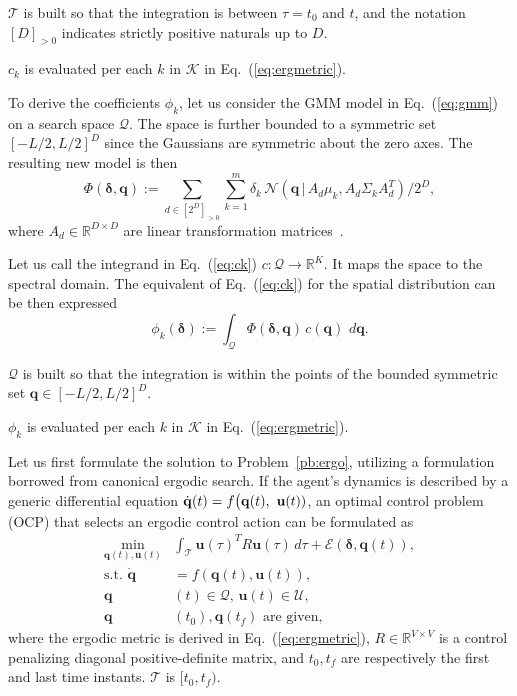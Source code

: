 \documentclass[letterpaper,10pt,conference,twoside]{IEEEtran}
\theoremstyle{definition}
\begin{document}
$\mathcal{T}$ is built so that the integration is between $\tau=t_0$ and $t$, and the notation $[D]_{>0}$ indicates strictly positive naturals up to $D$.

$c_k$ is evaluated per each $k$ in $\mathcal{K}$ in Eq.~(\ref{eq:ergmetric}).

To derive the coefficients $\phi_k$, let us consider the GMM model in Eq.~(\ref{eq:gmm}) on a search space $\mathcal{Q}$. The space is further bounded to a symmetric set $[-L/2,L/2]^D$ since the Gaussians are symmetric about the zero axes. The resulting new model is then
\begin{equation}
  \Phi(\boldsymbol{\delta},\mathbf{q}):=\sum_{d\in[2^D]_{>0}}\sum_{k=1}^{m}\delta_k\,\mathcal{N}(\mathbf{q}\,|\,A_d\mu_k,A_d\Sigma_k A_d^T)/2^D,
\end{equation}
where $A_d\in\mathbb{R}^{D\times D}$ are linear transformation matrices~\cite{calinon2020mixture}. 

Let us call the integrand in Eq.~(\ref{eq:ck}) $c:\mathcal{Q}\longrightarrow \mathbb{R}^K$. It maps the space to the spectral domain. The equivalent of Eq.~(\ref{eq:ck}) for the spatial distribution can be then expressed
\begin{equation}\label{eq:phik}
  \phi_k(\boldsymbol{\delta}):=\int_{\mathcal{Q}} \Phi(\boldsymbol{\delta},\mathbf{q})\,c(\mathbf{q})\,\,d\mathbf{q}.
\end{equation}

$\mathcal{Q}$ is built so that the integration is within the points of the bounded symmetric set $\mathbf{q}\in[-L/2,L/2]^D$.

$\phi_k$ is evaluated per each $k$ in $\mathcal{K}$ in Eq.~(\ref{eq:ergmetric}).

Let us first formulate the solution to Problem~\ref{pb:ergo}, utilizing a formulation borrowed from canonical ergodic search.
If the agent's dynamics is described by a generic differential equation $\dot{\mathbf{q}}(t)=f\big({\small\mathbf{q}(t),}$ ${\small\mathbf{u}(t)})$, an optimal control problem (OCP) that selects an ergodic control action can be formulated as~\cite{ayvali2017ergodic}
\begin{subequations}\label{eq:ocpergo}\begin{align}
  \min_{\mathbf{q}(t),\mathbf{u}(t)}&\int_{\mathcal{T}}\mathbf{u}(\tau)^TR\mathbf{u}(\tau)\,d\tau+{\mathcal{E}(\boldsymbol{\delta},\mathbf{q}(t))},\label{eq:ocpergomin}\\
  \text{s.t. }\dot{\mathbf{q}}&=f(\mathbf{q}(t),\mathbf{u}(t)),\\
  \mathbf{q}&(t)\in\mathcal{Q},\,\mathbf{u}(t)\in\mathcal{U},\\
  \mathbf{q}&(t_0), \mathbf{q}(t_f)\text{ are given},\label{eq:ocpconsttotf}
\end{align}\end{subequations}
where the ergodic metric is derived in Eq.~(\ref{eq:ergmetric}), $R\in\mathbb{R}^{V\times V}$ is a control penalizing diagonal positive-definite matrix, and $t_0, t_f$ are respectively the first and last time instants. 
$\mathcal{T}$ is $[t_0, t_f)$.
\end{document}
